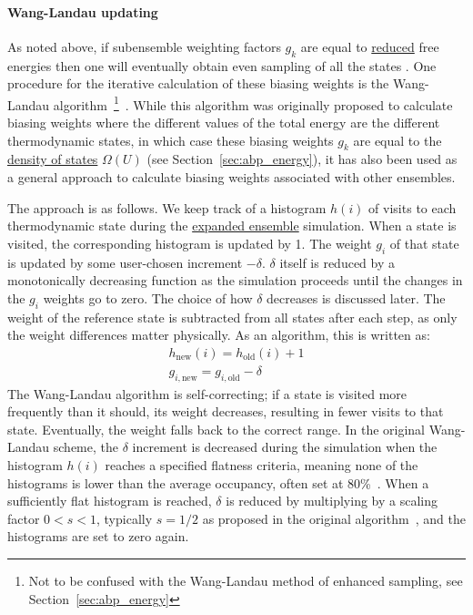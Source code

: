 \documentclass[9pt,review]{livecoms}
\begin{document}
\paragraph{Wang-Landau updating}
As noted above, if subensemble weighting factors $g_k$ are equal to \hyperlink{ref:reduced} {reduced} free energies then one will eventually obtain even sampling of all the states
\cite{lyubartsev:jcp:1992:expanded-ensembles}.  One procedure for the
iterative calculation of these biasing weights is the Wang-Landau
algorithm~\footnote{Not to be confused with the Wang-Landau method of enhanced sampling, see Section~\ref{sec:abp_energy}}~\cite{wang-landau:prl:2001:wang-landau}. While this algorithm was originally proposed to calculate biasing weights where the different values of the total energy are the different thermodynamic states, in which case these biasing weights $g_k$ are equal to the \hyperlink{ref:density_of_states} {density of states} $\Omega(U)$ (see Section~\ref{sec:abp_energy}), it has also been used as a general approach to calculate biasing weights associated with other ensembles.

The approach is as follows. We keep track of a histogram $h(i)$ of visits to each thermodynamic state during the \hyperlink{ref:ExpEns} {expanded ensemble} simulation.  When a state is visited, the corresponding
histogram is updated by 1.  The weight $g_i$ of that state is updated by some user-chosen increment $-\delta$.  $\delta$ itself is reduced by a monotonically decreasing function as the simulation proceeds until the changes in the $g_i$ weights go to zero. The choice of how $\delta$ decreases is discussed later. The
weight of the reference state is subtracted from all states after each step, as only the weight differences matter physically. As an algorithm, this is written as:
\begin{eqnarray}
h_{\mathrm{new}}(i) = h_{\mathrm{old}}(i) + 1 \\
g_{i,\mathrm{new}} = g_{i,\mathrm{old}} - \delta
\label{eq:wang-landau}
\end{eqnarray}
The Wang-Landau algorithm is self-correcting; if a state is visited more frequently than it should, its weight decreases, resulting in fewer visits to that state.  Eventually, the weight falls back to the correct range.  In the original Wang-Landau scheme, the $\delta$ increment is decreased during the simulation when the histogram $h(i)$ reaches a specified flatness criteria, meaning none of the histograms is lower than the average occupancy, often set at 80\%~\cite{wang-landau:prl:2001:wang-landau}.  When a sufficiently flat histogram is reached, $\delta$ is reduced by multiplying by a scaling factor $0<s<1$, typically $s=1/2$ as proposed in the original algorithm~\cite{wang-landau:prl:2001:wang-landau}, and the histograms are set to zero again.
\end{document}
